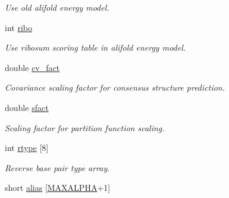 \begin{DoxyCompactItemize}
\begin{DoxyCompactList}\small\item\em Use old alifold energy model. \end{DoxyCompactList}\item 
\hypertarget{group__model__details_a3df2ae4bd9c133ef8ab92a53b1d035ec}{int \hyperlink{group__model__details_a3df2ae4bd9c133ef8ab92a53b1d035ec}{ribo}}\label{group__model__details_a3df2ae4bd9c133ef8ab92a53b1d035ec}

\begin{DoxyCompactList}\small\item\em Use ribosum scoring table in alifold energy model. \end{DoxyCompactList}\item 
\hypertarget{group__model__details_a62ebefb9d0643e5c4c8a2ec84a105ce6}{double \hyperlink{group__model__details_a62ebefb9d0643e5c4c8a2ec84a105ce6}{cv\-\_\-fact}}\label{group__model__details_a62ebefb9d0643e5c4c8a2ec84a105ce6}

\begin{DoxyCompactList}\small\item\em Covariance scaling factor for consensus structure prediction. \end{DoxyCompactList}\item 
\hypertarget{group__model__details_ab6f4cabaa9b4726b13592486d5bc21c7}{double \hyperlink{group__model__details_ab6f4cabaa9b4726b13592486d5bc21c7}{sfact}}\label{group__model__details_ab6f4cabaa9b4726b13592486d5bc21c7}

\begin{DoxyCompactList}\small\item\em Scaling factor for partition function scaling. \end{DoxyCompactList}\item 
\hypertarget{group__model__details_ad082d0fea31e002b90cdfe5e6382f8b0}{int \hyperlink{group__model__details_ad082d0fea31e002b90cdfe5e6382f8b0}{rtype} \mbox{[}8\mbox{]}}\label{group__model__details_ad082d0fea31e002b90cdfe5e6382f8b0}

\begin{DoxyCompactList}\small\item\em Reverse base pair type array. \end{DoxyCompactList}\item 
\hypertarget{group__model__details_a66136cf9abc8ff790ec0d33245d68fd5}{short \hyperlink{group__model__details_a66136cf9abc8ff790ec0d33245d68fd5}{alias} \mbox{[}\hyperlink{group__model__details_ga05a5ffe718aa431d97419a12fb082379}{M\-A\-X\-A\-L\-P\-H\-A}+1\mbox{]}}\label{group__model__details_a66136cf9abc8ff790ec0d33245d68fd5}


\end{DoxyCompactItemize}
